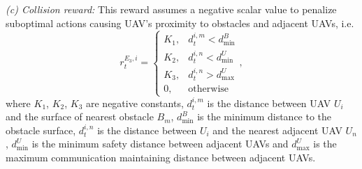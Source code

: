 \documentclass[conference]{IEEEtran}
\begin{document}
\textit{(c) Collision reward:} This reward assumes a negative scalar value to penalize suboptimal actions causing UAV's proximity to obstacles and adjacent UAVs, i.e.
\begin{equation}\label{reward_3}
r^{E_3,i}_{t}=
\begin{cases}
            K_1, & \mbox{$d^{i,m}_{t}<d_{\min}^{B}$}\\
            K_2, & \mbox{$d^{i,n}_{t}<d^{U}_{\min}$}\\
            K_3, & \mbox{$d^{i,n}_{t}>d^{U}_{\max}$}\\
            0, & \mbox{otherwise}
\end{cases},
\end{equation}
where $K_1$, $K_2$, $K_3$ are negative constants, $d^{i,m}_{t}$ is the distance between UAV $U_i$ and the surface of nearest obstacle $B_m$, $d_{\min}^{B}$ is the minimum distance to the obstacle surface, $d^{i,n}_{t}$ is the distance between $U_i$ and the nearest adjacent UAV $U_n$, $d^{U}_{\min}$ is the minimum safety distance between adjacent UAVs and $d^{U}_{\max}$ is the maximum communication maintaining distance between adjacent UAVs. 
\end{document}
